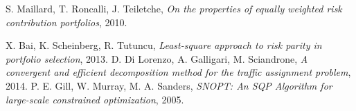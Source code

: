 S. Maillard, T. Roncalli, J. Teiletche,
\emph{On the properties of equally weighted risk contribution portfolios}, 
2010.

  X. Bai, K. Scheinberg, R. Tutuncu,
  \emph{Least-square approach to risk parity in portfolio selection},
  2013.   
D. Di Lorenzo, A. Galligari, M. Sciandrone,
  \emph{A convergent and efficient decomposition method for the traffic assignment problem},
  2014.
	P. E. Gill, W. Murray, M. A. Sanders,
	\emph{SNOPT: An SQP Algorithm for large-scale constrained optimization}, 
	2005.
